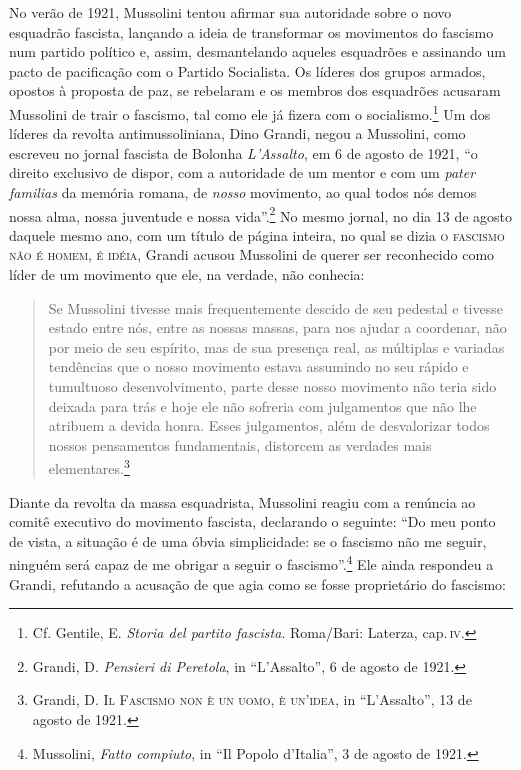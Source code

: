 No verão de 1921, Mussolini tentou afirmar sua autoridade sobre o novo
esquadrão fascista, lançando a ideia de transformar os movimentos do
fascismo num partido político e, assim, desmantelando aqueles esquadrões
e assinando um pacto de pacificação com o Partido Socialista. Os líderes
dos grupos armados, opostos à proposta de paz, se rebelaram e os membros
dos esquadrões acusaram Mussolini de trair o fascismo, tal como ele já
fizera com o socialismo.\footnote{Cf. Gentile, E. \emph{Storia del
  partito fascista}. Roma/Bari: Laterza, cap.\,\textsc{iv}.} Um dos líderes da
revolta antimussoliniana, Dino Grandi, negou a Mussolini, como escreveu
no jornal fascista de Bolonha \emph{L'Assalto}, em 6 de agosto de 1921,
``o direito exclusivo de dispor, com a autoridade de um mentor e com um
\emph{pater familias} da memória romana, de \emph{nosso} movimento, ao
qual todos nós demos nossa alma, nossa juventude e nossa vida''.\footnote{Grandi,
  D. \emph{Pensieri di Peretola}, in ``L'Assalto'', 6 de agosto de 1921.}
No mesmo jornal, no dia 13 de agosto daquele mesmo ano, com um título de
página inteira, no qual se dizia \textsc{o fascismo não é homem, é idéia},
Grandi acusou Mussolini de querer ser reconhecido como líder de um
movimento que ele, na verdade, não conhecia:

\begin{quote}
Se Mussolini tivesse mais frequentemente descido de seu pedestal e
tivesse estado entre nós, entre as nossas massas, para nos ajudar a
coordenar, não por meio de seu espírito, mas de sua presença real, as
múltiplas e variadas tendências que o nosso movimento estava assumindo
no seu rápido e tumultuoso desenvolvimento, parte desse nosso movimento
não teria sido deixada para trás e hoje ele não sofreria com julgamentos
que não lhe atribuem a devida honra. Esses julgamentos, além de
desvalorizar todos nossos pensamentos fundamentais, distorcem as
verdades mais elementares.\footnote{Grandi, D. \textsc{Il Fascismo non è
  un uomo, è un'idea}, in ``L'Assalto'', 13 de agosto de 1921.}
\end{quote}

Diante da revolta da massa esquadrista, Mussolini reagiu com a renúncia
ao comitê executivo do movimento fascista, declarando o seguinte: ``Do
meu ponto de vista, a situação é de uma óbvia simplicidade: se o
fascismo não me seguir, ninguém será capaz de me obrigar a seguir o
fascismo''.\footnote{Mussolini, \emph{Fatto compiuto}, in ``Il Popolo
  d'Italia'', 3 de agosto de 1921.} Ele ainda respondeu a Grandi,
refutando a acusação de que agia como se fosse proprietário do fascismo:

